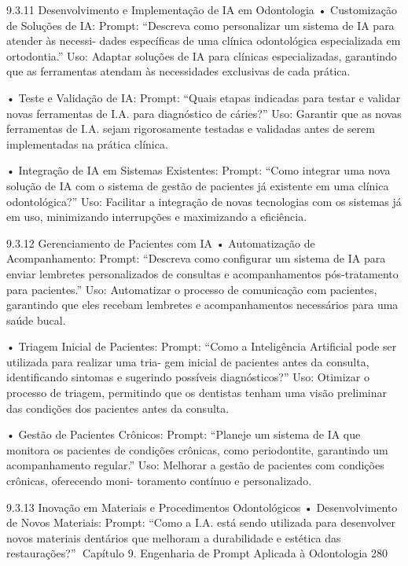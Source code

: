 9.3.11     Desenvolvimento e Implementação de IA em Odontologia
    • Customização de Soluções de IA:
      Prompt: “Descreva como personalizar um sistema de IA para atender às necessi-
      dades específicas de uma clínica odontológica especializada em ortodontia.”
      Uso: Adaptar soluções de IA para clínicas especializadas, garantindo que as
      ferramentas atendam às necessidades exclusivas de cada prática.

    • Teste e Validação de IA:
      Prompt: “Quais etapas indicadas para testar e validar novas ferramentas de I.A.
      para diagnóstico de cáries?”
      Uso: Garantir que as novas ferramentas de I.A. sejam rigorosamente testadas e
      validadas antes de serem implementadas na prática clínica.

    • Integração de IA em Sistemas Existentes:
      Prompt: “Como integrar uma nova solução de IA com o sistema de gestão de
      pacientes já existente em uma clínica odontológica?”
      Uso: Facilitar a integração de novas tecnologias com os sistemas já em uso,
      minimizando interrupções e maximizando a eficiência.

9.3.12     Gerenciamento de Pacientes com IA
    • Automatização de Acompanhamento:
      Prompt: “Descreva como configurar um sistema de IA para enviar lembretes
      personalizados de consultas e acompanhamentos pós-tratamento para pacientes.”
      Uso: Automatizar o processo de comunicação com pacientes, garantindo que
      eles recebam lembretes e acompanhamentos necessários para uma saúde bucal.

    • Triagem Inicial de Pacientes:
      Prompt: “Como a Inteligência Artificial pode ser utilizada para realizar uma tria-
      gem inicial de pacientes antes da consulta, identificando sintomas e sugerindo
      possíveis diagnósticos?”
      Uso: Otimizar o processo de triagem, permitindo que os dentistas tenham uma
      visão preliminar das condições dos pacientes antes da consulta.

    • Gestão de Pacientes Crônicos:
      Prompt: “Planeje um sistema de IA que monitora os pacientes de condições
      crônicas, como periodontite, garantindo um acompanhamento regular.”
      Uso: Melhorar a gestão de pacientes com condições crônicas, oferecendo moni-
      toramento contínuo e personalizado.

9.3.13     Inovação em Materiais e Procedimentos Odontológicos
    • Desenvolvimento de Novos Materiais:
      Prompt: “Como a I.A. está sendo utilizada para desenvolver novos materiais
      dentários que melhoram a durabilidade e estética das restaurações?”
Capítulo 9. Engenharia de Prompt Aplicada à Odontologia                               280


